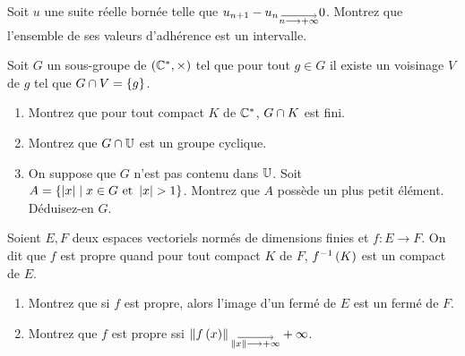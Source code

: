 \begin{corr}
\end{corr}

\begin{exo}
Soit \(u\) une suite réelle bornée telle que \(u_{n+1}-u_n\tendqd{n\to\pinf}0\). Montrez que l'ensemble de ses valeurs d'adhérence est un intervalle.
\end{exo}

\begin{corr}
\end{corr}

\begin{exo}
Soit \(G\) un sous-groupe de \(\groupe{\Cs}[\times]\) tel que pour tout \(g\in G\) il existe un voisinage \(V\) de \(g\) tel que \(G\cap V=\left\lbrace g\right\rbrace\).

\begin{enumerate}
    \item Montrez que pour tout compact \(K\) de \(\mathbb{C}^*\), \(G\cap K\) est fini. \\
    \item Montrez que \(G\cap\mathbb{U}\) est un groupe cyclique. \\
    \item On suppose que \(G\) n'est pas contenu dans \(\mathbb{U}\). Soit \(A=\left\lbrace\left\lvert x\right\rvert\;\middle|\; x\in G\text{ et }\left\lvert x\right\rvert>1\right\rbrace\). Montrez que \(A\) possède un plus petit élément. Déduisez-en \(G\).
\end{enumerate}
\end{exo}

\begin{corr}
\end{corr}

\begin{exo}
Soient \(E,F\) deux espaces vectoriels normés de dimensions finies et \(f:E\to F\). On dit que \(f\) est propre quand pour tout compact \(K\) de \(F\), \(f^{-1}\left(K\right)\) est un compact de \(E\).

\begin{enumerate}
    \item Montrez que si \(f\) est propre, alors l'image d'un fermé de \(E\) est un fermé de \(F\). \\
    \item Montrez que \(f\) est propre ssi \(\norme{f\paren{x}}\tendqd{\norme{x}\to\pinf}\pinf\).
\end{enumerate}
\end{exo}

